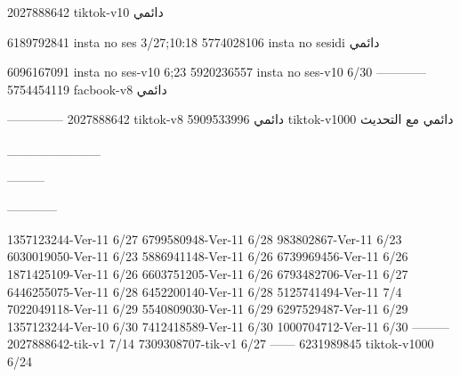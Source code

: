 2027888642 tiktok-v10
دائمي

6189792841 insta no ses
3/27;10:18
5774028106 insta no sesidi
دائمي

6096167091 insta no ses-v10
6;23
5920236557 insta no ses-v10
6/30
------------
5754454119 facbook-v8
دائمي


--------------
2027888642 tiktok-v8
دائمي
5909533996 tiktok-v1000
دائمي مع التحديث

__________

---------


------------

1357123244-Ver-11
6/27
6799580948-Ver-11
6/28
983802867-Ver-11
6/23
6030019050-Ver-11
6/23
5886941148-Ver-11
6/26
6739969456-Ver-11
6/26
1871425109-Ver-11
6/26
6603751205-Ver-11
6/26
6793482706-Ver-11
6/27
6446255075-Ver-11
6/28
6452200140-Ver-11
6/28
5125741494-Ver-11
7/4
7022049118-Ver-11
6/29
5540809030-Ver-11
6/29
6297529487-Ver-11
6/29
1357123244-Ver-10
6/30
7412418589-Ver-11
6/30
1000704712-Ver-11
6/30
---------
2027888642-tik-v1
7/14
7309308707-tik-v1
6/27
------
6231989845 tiktok-v1000
6/24
